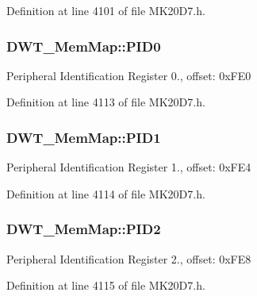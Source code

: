 Definition at line 4101 of file M\+K20\+D7.\+h.

\subsubsection[{\texorpdfstring{P\+I\+D0}{PID0}}]{ D\+W\+T\+\_\+\+Mem\+Map\+::\+P\+I\+D0}\hypertarget{struct_d_w_t___mem_map_a822de5f73ae889eaedbe7ae65428b786}{}\label{struct_d_w_t___mem_map_a822de5f73ae889eaedbe7ae65428b786}
Peripheral Identification Register 0., offset\+: 0x\+F\+E0 

Definition at line 4113 of file M\+K20\+D7.\+h.

\subsubsection[{\texorpdfstring{P\+I\+D1}{PID1}}]{ D\+W\+T\+\_\+\+Mem\+Map\+::\+P\+I\+D1}\hypertarget{struct_d_w_t___mem_map_a3f93dbcfbf07c35986c4d989c0bde40e}{}\label{struct_d_w_t___mem_map_a3f93dbcfbf07c35986c4d989c0bde40e}
Peripheral Identification Register 1., offset\+: 0x\+F\+E4 

Definition at line 4114 of file M\+K20\+D7.\+h.

\subsubsection[{\texorpdfstring{P\+I\+D2}{PID2}}]{ D\+W\+T\+\_\+\+Mem\+Map\+::\+P\+I\+D2}\hypertarget{struct_d_w_t___mem_map_a3feefc504238282fa83875bb6c754fd0}{}\label{struct_d_w_t___mem_map_a3feefc504238282fa83875bb6c754fd0}
Peripheral Identification Register 2., offset\+: 0x\+F\+E8 

Definition at line 4115 of file M\+K20\+D7.\+h.

